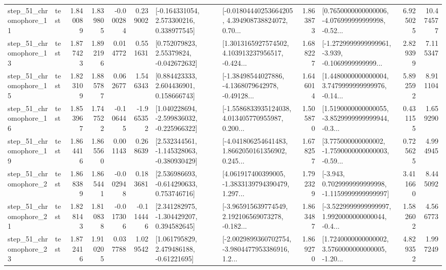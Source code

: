 \begin{tabular}{llrrrrllrlrr}
   step\_51\_chromophore\_11 &      test &      1.840089 &    1.839805 &     -0.000284 &  0.239002 &    [-0.164331054, 2.573300216, 0.338977545] &  [-0.01804440253664205, 4.394908738824072, 0.70... &       1.863873 &  [0.7650000000000006, -4.076999999999998, -0.52... &            6.925025 &         10.474577 \\
   step\_51\_chromophore\_13 &      test &      1.877423 &    1.892196 &      0.014772 &  0.551631 &     [0.752079823, 2.55379824, -0.042672632] &  [1.3013165927574502, 4.103913237956517, -0.424... &       1.688227 &  [-1.2729999999999961, -3.939, -0.1069999999999... &            2.829399 &          7.115347 \\
   step\_51\_chromophore\_15 &      test &      1.823109 &    1.885787 &      0.062677 &  1.546343 &     [0.884423333, 2.604436901, 0.158666743] &  [-1.38498544027886, -4.1368079642978, -0.49128... &       1.646014 &  [1.4480000000000004, 3.7479999999999976, -0.14... &            5.892592 &          8.911104 \\
   step\_51\_chromophore\_16 &      test &      1.853967 &    1.747522 &     -0.106445 & -1.965352 &   [1.040228694, -2.599836032, -0.225966322] &  [-1.5586833935124038, 4.013405770955987, 0.200... &       1.505870 &  [1.5190000000000055, -3.8529999999999944, -0.3... &            0.431155 &          1.659290 \\
   step\_51\_chromophore\_19 &      test &      1.864416 &    1.865560 &      0.001143 &  0.268639 &   [2.532344561, -1.145328063, -0.380930429] &  [-4.041806254641483, 1.8662050161356902, 0.245... &       1.678257 &  [3.775000000000002, -1.7590000000000003, -0.59... &            0.725625 &          4.994945 \\
    step\_51\_chromophore\_2 &      test &      1.868389 &    1.865441 &     -0.002948 &  0.183681 &    [2.536986693, -0.614290633, 0.753746716] &  [4.061917400399005, -1.3833139794390479, 1.297... &       1.792329 &  [-3.943, 0.7029999999999998, -1.1159999999999997] &            3.411660 &          8.445092 \\
   step\_51\_chromophore\_21 &      test &      1.828143 &    1.810838 &     -0.017306 & -0.114446 &    [2.341282975, -1.304429207, 0.394582645] &  [-3.965915639774549, 2.192106569073278, -0.182... &       1.863487 &  [-3.5229999999999997, 1.9920000000000044, -0.4... &            1.582602 &          4.566773 \\
   step\_51\_chromophore\_23 &      test &      1.872416 &    1.910205 &      0.037788 &  1.029542 &     [1.061795829, 2.479486188, -0.61221695] &  [-2.0029899360702754, -3.9804477953386916, 1.2... &       1.869270 &  [1.7240000000000002, 3.5760000000000005, -1.20... &            4.829352 &          1.997249 \\

\end{tabular}
